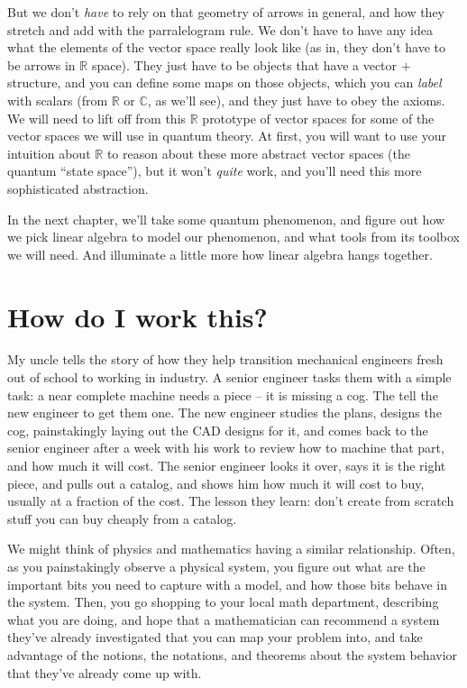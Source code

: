 \documentclass[
]{book}
\begin{document}
But we don't \emph{have} to rely on that geometry of arrows in general, and how they stretch and add with the parralelogram rule. We don't have to have any idea what the elements of the vector space really look like (as in, they don't have to be arrows in \(\mathbb{R}\) space). They just have to be objects that have a vector \(+\) structure, and you can define some maps on those objects, which you can \emph{label} with scalars (from \(\mathbb{R}\) or \(\mathbb{C}\), as we'll see), and they just have to obey the axioms. We will need to lift off from this \(\mathbb{R}\) prototype of vector spaces for some of the vector spaces we will use in quantum theory. At first, you will want to use your intuition about \(\mathbb{R}\) to reason about these more abstract vector spaces (the quantum ``state space''), but it won't \emph{quite} work, and you'll need this more sophisticated abstraction.

In the next chapter, we'll take some quantum phenomenon, and figure out how we pick linear algebra to model our phenomenon, and what tools from its toolbox we will need. And illuminate a little more how linear algebra hangs together.

\hypertarget{how-do-i-work-this}{%
\chapter{How do I work this?}\label{how-do-i-work-this}}

My uncle tells the story of how they help transition mechanical engineers fresh out of school to working in industry. A senior engineer tasks them with a simple task: a near complete machine needs a piece -- it is missing a cog. The tell the new engineer to get them one. The new engineer studies the plans, designs the cog, painstakingly laying out the CAD designs for it, and comes back to the senior engineer after a week with his work to review how to machine that part, and how much it will cost. The senior engineer looks it over, says it is the right piece, and pulls out a catalog, and shows him how much it will cost to buy, usually at a fraction of the cost. The lesson they learn: don't create from scratch stuff you can buy cheaply from a catalog.

We might think of physics and mathematics having a similar relationship. Often, as you painstakingly observe a physical system, you figure out what are the important bits you need to capture with a model, and how those bits behave in the system. Then, you go shopping to your local math department, describing what you are doing, and hope that a mathematician can recommend a system they've already investigated that you can map your problem into, and take advantage of the notions, the notations, and theorems about the system behavior that they've already come up with.
\end{document}
